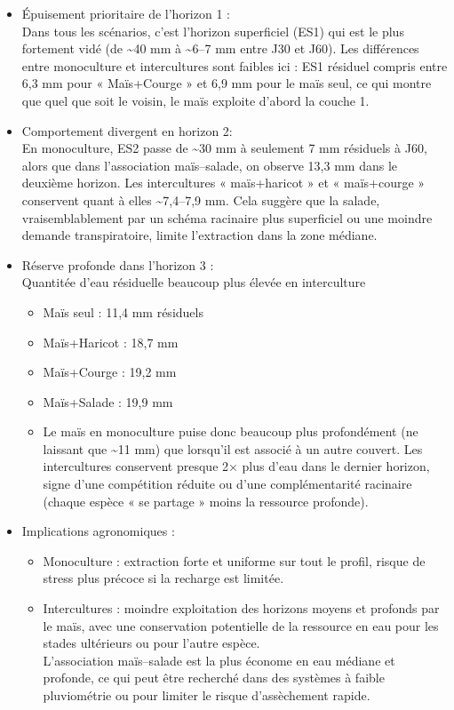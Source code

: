 \documentclass[
]{article}
\providecommand{\tightlist}{%
  \setlength{\itemsep}{0pt}\setlength{\parskip}{0pt}}
\begin{document}
\begin{itemize}
\tightlist
\item
  Épuisement prioritaire de l'horizon 1 :\\
  Dans tous les scénarios, c'est l'horizon superficiel (ES1) qui est le
  plus fortement vidé (de \textasciitilde40 mm à \textasciitilde6--7 mm
  entre J30 et J60). Les différences entre monoculture et intercultures
  sont faibles ici : ES1 résiduel compris entre 6,3 mm pour «
  Maïs+Courge » et 6,9 mm pour le maïs seul, ce qui montre que quel que
  soit le voisin, le maïs exploite d'abord la couche 1.
\item
  Comportement divergent en horizon 2:\\
  En monoculture, ES2 passe de \textasciitilde30 mm à seulement 7 mm
  résiduels à J60, alors que dans l'association maïs--salade, on observe
  13,3 mm dans le deuxième horizon. Les intercultures « maïs+haricot »
  et « maïs+courge » conservent quant à elles \textasciitilde7,4--7,9
  mm. Cela suggère que la salade, vraisemblablement par un schéma
  racinaire plus superficiel ou une moindre demande transpiratoire,
  limite l'extraction dans la zone médiane.
\item
  Réserve profonde dans l'horizon 3 :\\
  Quantitée d'eau résiduelle beaucoup plus élevée en interculture

  \begin{itemize}
  \tightlist
  \item
    Maïs seul : 11,4 mm résiduels
  \item
    Maïs+Haricot : 18,7 mm
  \item
    Maïs+Courge : 19,2 mm
  \item
    Maïs+Salade : 19,9 mm
  \item
    Le maïs en monoculture puise donc beaucoup plus profondément (ne
    laissant que \textasciitilde11 mm) que lorsqu'il est associé à un
    autre couvert. Les intercultures conservent presque 2× plus d'eau
    dans le dernier horizon, signe d'une compétition réduite ou d'une
    complémentarité racinaire (chaque espèce « se partage » moins la
    ressource profonde).
  \end{itemize}
\item
  Implications agronomiques :

  \begin{itemize}
  \tightlist
  \item
    Monoculture : extraction forte et uniforme sur tout le profil,
    risque de stress plus précoce si la recharge est limitée.
  \item
    Intercultures : moindre exploitation des horizons moyens et profonds
    par le maïs, avec une conservation potentielle de la ressource en
    eau pour les stades ultérieurs ou pour l'autre espèce.\\
    L'association maïs--salade est la plus économe en eau médiane et
    profonde, ce qui peut être recherché dans des systèmes à faible
    pluviométrie ou pour limiter le risque d'assèchement rapide.
  \end{itemize}
\end{itemize}
\end{document}
